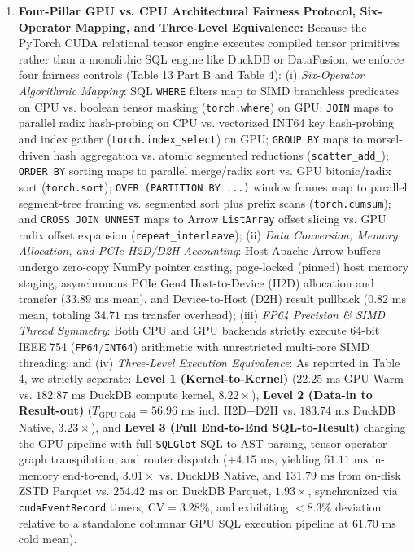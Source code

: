 \documentclass[10pt,a4paper]{article}
\begin{document}
\begin{enumerate}[leftmargin=1.5em,itemsep=2pt]
external 22-query TPC-H suite (Q1--Q22) exhibits strong alignment with AST node complexity ($\rho = 0.8418, p = 9.12\times 10^{-7}$) and a partial correlation of $\rho_{\text{partial}} = 0.5840$ ($p = 0.0054$) with join/subquery execution work controlling for scanned table volume.
    \item \textbf{Four-Pillar GPU vs. CPU Architectural Fairness Protocol, Six-Operator Mapping, and Three-Level Equivalence:} Because the PyTorch CUDA relational tensor engine executes compiled tensor primitives rather than a monolithic SQL engine like DuckDB or DataFusion, we enforce four fairness controls (Table 13 Part B and Table 4): (i) \emph{Six-Operator Algorithmic Mapping}: SQL \texttt{WHERE} filters map to SIMD branchless predicates on CPU vs. boolean tensor masking (\texttt{torch.where}) on GPU; \texttt{JOIN} maps to parallel radix hash-probing on CPU vs. vectorized INT64 key hash-probing and index gather (\texttt{torch.index\_select}) on GPU; \texttt{GROUP BY} maps to morsel-driven hash aggregation vs. atomic segmented reductions (\texttt{scatter\_add\_}); \texttt{ORDER BY} sorting maps to parallel merge/radix sort vs. GPU bitonic/radix sort (\texttt{torch.sort}); \texttt{OVER (PARTITION BY ...)} window frames map to parallel segment-tree framing vs. segmented sort plus prefix scans (\texttt{torch.cumsum}); and \texttt{CROSS JOIN UNNEST} maps to Arrow \texttt{ListArray} offset slicing vs. GPU radix offset expansion (\texttt{repeat\_interleave}); (ii) \emph{Data Conversion, Memory Allocation, and PCIe H2D/D2H Accounting}: Host Apache Arrow buffers undergo zero-copy NumPy pointer casting, page-locked (pinned) host memory staging, asynchronous PCIe Gen4 Host-to-Device (H2D) allocation and transfer ($33.89\text{ ms}$ mean), and Device-to-Host (D2H) result pullback ($0.82\text{ ms}$ mean, totaling $34.71\text{ ms}$ transfer overhead); (iii) \emph{FP64 Precision \& SIMD Thread Symmetry}: Both CPU and GPU backends strictly execute 64-bit IEEE 754 (\texttt{FP64}/\texttt{INT64}) arithmetic with unrestricted multi-core SIMD threading; and (iv) \emph{Three-Level Execution Equivalence}: As reported in Table 4, we strictly separate: \textbf{Level 1 (Kernel-to-Kernel)} ($22.25\text{ ms}$ GPU Warm vs. $182.87\text{ ms}$ DuckDB compute kernel, $8.22\times$), \textbf{Level 2 (Data-in to Result-out)} ($T_{\text{GPU\_Cold}} = 56.96\text{ ms}$ incl. H2D+D2H vs. $183.74\text{ ms}$ DuckDB Native, $3.23\times$), and \textbf{Level 3 (Full End-to-End SQL-to-Result)} charging the GPU pipeline with full \texttt{SQLGlot} SQL-to-AST parsing, tensor operator-graph transpilation, and router dispatch ($+4.15\text{ ms}$, yielding $61.11\text{ ms}$ in-memory end-to-end, $3.01\times$ vs. DuckDB Native, and $131.79\text{ ms}$ from on-disk ZSTD Parquet vs. $254.42\text{ ms}$ on DuckDB Parquet, $1.93\times$, synchronized via \texttt{cudaEventRecord} timers, $\text{CV}=3.28\%$, and exhibiting $<8.3\%$ deviation relative to a standalone columnar GPU SQL execution pipeline at $61.70\text{ ms}$ cold mean). 

\end{enumerate}
\end{document}
